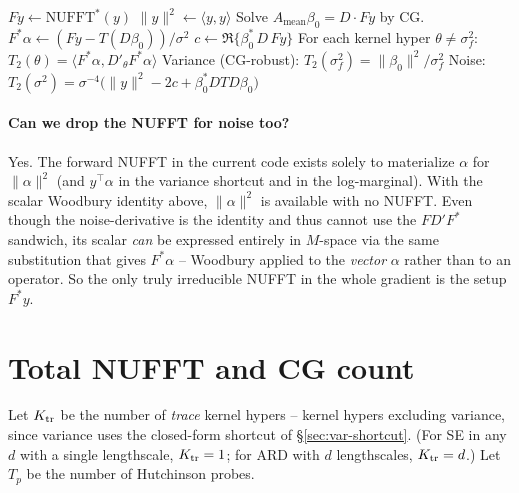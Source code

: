 \documentclass[11pt]{article}
\newcommand{\bigo}{\mathcal{O}}
\begin{document}
\begin{algorithm}[h]
\caption{Proposed $T_2$ path for all hypers.}
\begin{algorithmic}[1]
\State $Fy \leftarrow \text{NUFFT}^*(y)$ 
\State $\|y\|^2 \leftarrow \langle y, y\rangle$ \Comment{$\bigo(N)$ setup scalar}
\State Solve $A_{\text{mean}}\beta_0 = D\cdot Fy$ by CG.
\State $F^*\alpha \leftarrow (Fy - T(D\beta_0))/\sigma^2$ 
\State $c \leftarrow \Re\{\beta_0^*\, D\, Fy\}$ 
\State For each kernel hyper $\theta\ne\sigma_f^2$: $T_2(\theta) = \langle F^*\alpha, D'_\theta F^*\alpha\rangle$
\State Variance (CG-robust): $T_2(\sigma_f^2) = \|\beta_0\|^2/\sigma_f^2$
\State Noise: $T_2(\sigma^2) = \sigma^{-4}\bigl(\|y\|^2 - 2c + \beta_0^* DTD\beta_0\bigr)$
\end{algorithmic}
\end{algorithm}

\paragraph{Can we drop the NUFFT for noise too?}
Yes. The forward NUFFT in the current code exists solely to materialize $\alpha$ for $\|\alpha\|^2$ (and $y^\top\alpha$ in the variance shortcut and in the log-marginal). With the scalar Woodbury identity above, $\|\alpha\|^2$ is available with no NUFFT. Even though the noise-derivative is the identity and thus cannot use the $FD'F^*$ sandwich, its scalar \emph{can} be expressed entirely in $M$-space via the same substitution that gives $F^*\alpha$ -- Woodbury applied to the \emph{vector} $\alpha$ rather than to an operator. So the only truly irreducible NUFFT in the whole gradient is the setup $F^*y$.

\section{Total NUFFT and CG count}

Let $K_{\rm tr}$ be the number of \emph{trace} kernel hypers -- kernel hypers excluding variance, since variance uses the closed-form shortcut of \S\ref{sec:var-shortcut}. (For SE in any $d$ with a single lengthscale, $K_{\rm tr}=1$; for ARD with $d$ lengthscales, $K_{\rm tr}=d$.) Let $T_p$ be the number of Hutchinson probes.
\end{document}
